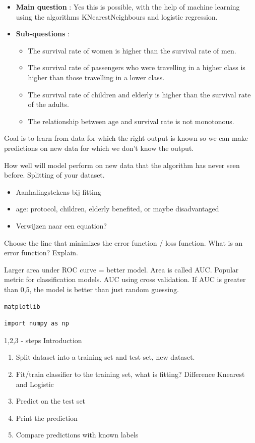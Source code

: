 \documentclass[11pt]{article}
\begin{document}
\begin{itemize}
\item \textbf{Main question} : Yes this is possible, with the help of machine learning using the algorithms KNearestNeighbours and logistic regression.
\item \textbf{Sub-questions} :

\begin{itemize}
\item The survival rate of women is higher than the survival rate of men.
\item The survival rate of passengers who were travelling in a higher class is higher than those travelling in a lower class.
\item The survival rate of children and elderly is higher than the survival rate of the adults.
\item The relationship between age and survival rate is not monotonous.
\end{itemize}
\end{itemize}




Goal is to learn from data for which the right output is known so we can make predictions on new data for which we don't know the output.


How well will model perform on new data that the algorithm has never seen before. Splitting of your dataset. 

\begin{itemize}
\item Aanhalingstekens bij fitting
\item age: protocol, children, elderly benefited, or maybe disadvantaged
\item Verwijzen naar een equation?
\end{itemize}


Choose the line that minimizes the error function / loss function. What is an error function? Explain.

Larger area under ROC curve = better model. Area is called AUC. Popular metric for classification models. AUC using cross validation. If AUC is greater than 0,5, the model is better than just random guessing. 


\texttt{matplotlib}

\begin{verbatim}
import numpy as np
\end{verbatim}


1,2,3 - steps Introduction
\begin{enumerate}
\item Split dataset into a training set and test set, new dataset.
\item Fit/train classifier to the training set, what is fitting? Difference Knearest and Logistic
\item Predict on the test set
\item Print the prediction
\item Compare predictions with known labels
\end{enumerate}
\end{document}
